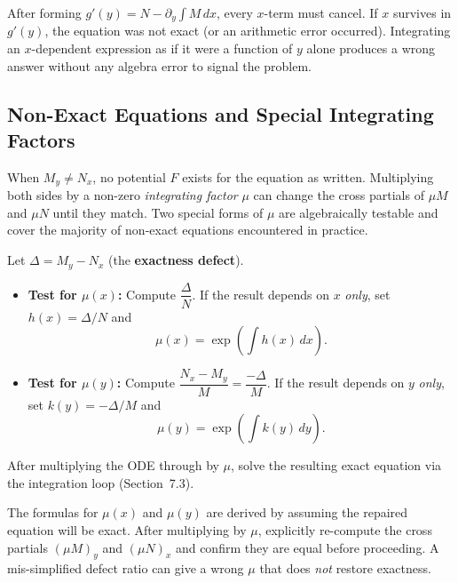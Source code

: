 \begin{warningbox}
After forming $g'(y) = N - \partial_y\!\int M\,dx$, every $x$-term must
cancel. If $x$ survives in $g'(y)$, the equation was not exact (or an
arithmetic error occurred). Integrating an $x$-dependent expression as if it
were a function of $y$ alone produces a wrong answer without any algebra error
to signal the problem.
\end{warningbox}

\subsection{Non-Exact Equations and Special Integrating Factors}

When $M_y \neq N_x$, no potential $F$ exists for the equation as written.
Multiplying both sides by a non-zero \emph{integrating factor} $\mu$ can
change the cross partials of $\mu M$ and $\mu N$ until they match. Two
special forms of $\mu$ are algebraically testable and cover the majority of
non-exact equations encountered in practice.

\begin{formulabox}
Let $\Delta = M_y - N_x$ (the \textbf{exactness defect}).
\begin{itemize}[leftmargin=1.4em, itemsep=4pt]
    \item \textbf{Test for $\mu(x)$:} Compute $\dfrac{\Delta}{N}$.
          If the result depends on $x$ \emph{only}, set $h(x)=\Delta/N$ and
          \[
            \mu(x) = \exp\!\left(\int h(x)\,dx\right).
          \]
    \item \textbf{Test for $\mu(y)$:} Compute $\dfrac{N_x - M_y}{M}
          = \dfrac{-\Delta}{M}$.
          If the result depends on $y$ \emph{only}, set $k(y)=-\Delta/M$ and
          \[
            \mu(y) = \exp\!\left(\int k(y)\,dy\right).
          \]
\end{itemize}
After multiplying the ODE through by $\mu$, solve the resulting exact equation
via the integration loop (Section~7.3).
\end{formulabox}

\begin{warningbox}
The formulas for $\mu(x)$ and $\mu(y)$ are derived by assuming the repaired
equation will be exact. After multiplying by $\mu$, explicitly re-compute the
cross partials $(\mu M)_y$ and $(\mu N)_x$ and confirm they are equal before
proceeding. A mis-simplified defect ratio can give a wrong $\mu$ that does
\emph{not} restore exactness.
\end{warningbox}


